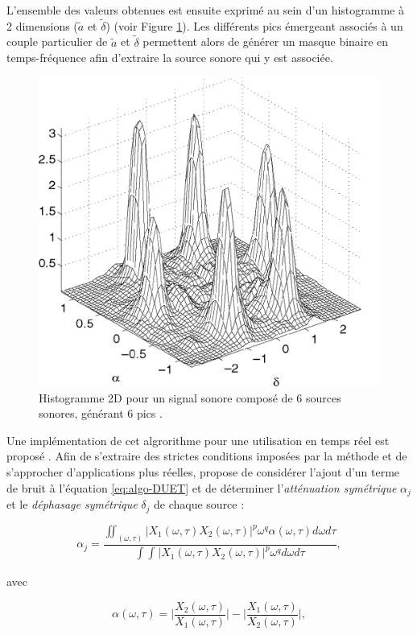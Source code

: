 L'ensemble des valeurs obtenues est ensuite exprimé au sein d'un histogramme à 2 dimensions ($\tilde{a}$ et $\tilde{\delta}$) (voir Figure \ref{fig:DUET_hist}).
Les différents pics émergeant associés à un couple particulier de $\tilde{a}$ et $\tilde{\delta}$ permettent alors de générer un masque binaire en temps-fréquence afin d'extraire la source sonore qui y est associée.

\begin{figure}[t]
\centering
\includegraphics[width = 0.6\linewidth]{./figures/autres/DUET_histogram.png}
\caption{Histogramme 2D pour un signal sonore composé de 6 sources sonores, générant 6 pics \cite{yilmaz2004blind}.}
\label{fig:DUET_hist}
\end{figure}

Une implémentation de cet algrorithme pour une utilisation en temps réel est proposé \cite{rickard2001real}.
Afin de s'extraire des strictes conditions imposées par la méthode et de s'approcher d'applications plus réelles, \cite{rickard2007duet} propose de considérer l'ajout d'un terme de bruit à l'équation \ref{eq:algo-DUET} et de déterminer l'\textit{atténuation symétrique} $\alpha_j$ et le \textit{déphasage symétrique} $\delta_j$ de chaque source : 

\begin{equation}
\alpha_j = \frac{\iint_{(\omega,\tau)} \vert X_1(\omega,\tau) X_2(\omega,\tau)\vert ^p \omega^q \alpha(\omega,\tau) d\omega d\tau}{\int \int_{}\vert X_1(\omega,\tau) X_2(\omega,\tau)\vert ^p \omega^q d\omega d\tau},
\end{equation}

avec

\begin{equation}
\alpha(\omega,\tau) = \bigg\vert \frac{X_2(\omega,\tau)}{X_1(\omega,\tau)} \bigg\vert - \bigg\vert  \frac{X_1(\omega,\tau)}{X_2(\omega,\tau)} \bigg\vert,
\end{equation}

